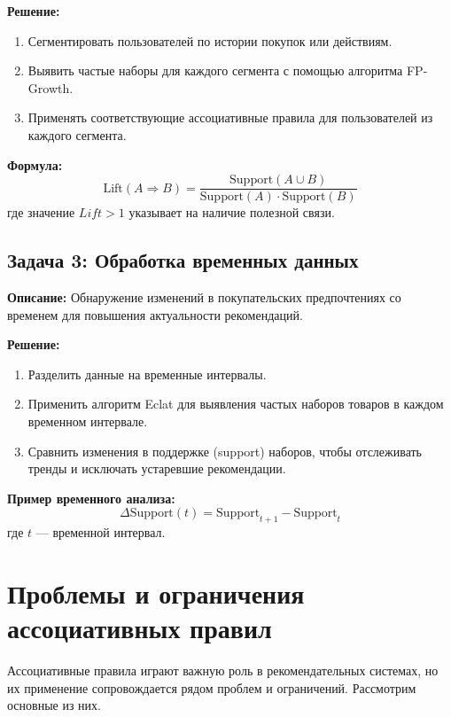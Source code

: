 \documentclass[a4paper,12pt]{article}
\begin{document}
\textbf{Решение:}
\begin{enumerate}
    \item Сегментировать пользователей по истории покупок или действиям.
    \item Выявить частые наборы для каждого сегмента с помощью алгоритма FP-Growth.
    \item Применять соответствующие ассоциативные правила для пользователей из каждого сегмента.
\end{enumerate}

\textbf{Формула:}
\begin{equation}
    \text{Lift}(A \Rightarrow B) = \frac{\text{Support}(A \cup B)}{\text{Support}(A) \cdot \text{Support}(B)}
\end{equation}
где значение $Lift > 1$ указывает на наличие полезной связи.

\subsection{Задача 3: Обработка временных данных}
\textbf{Описание:} 
Обнаружение изменений в покупательских предпочтениях со временем для повышения актуальности рекомендаций.

\textbf{Решение:}
\begin{enumerate}
    \item Разделить данные на временные интервалы.
    \item Применить алгоритм Eclat для выявления частых наборов товаров в каждом временном интервале.
    \item Сравнить изменения в поддержке (support) наборов, чтобы отслеживать тренды и исключать устаревшие рекомендации.
\end{enumerate}

\textbf{Пример временного анализа:}
\begin{equation}
    \Delta \text{Support}(t) = \text{Support}_{t+1} - \text{Support}_{t}
\end{equation}
где $t$ — временной интервал.



\section{Проблемы и ограничения ассоциативных правил}

Ассоциативные правила играют важную роль в рекомендательных системах, но их применение сопровождается рядом проблем и ограничений. Рассмотрим основные из них.
\end{document}
